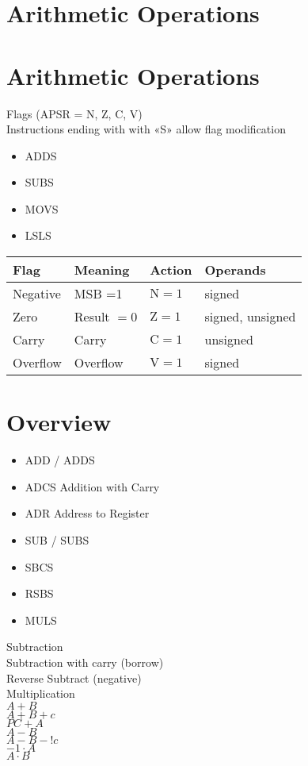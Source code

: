 \section{Arithmetic Operations}

\section*{Arithmetic Operations}
Flags (APSR = N, Z, C, V)\\
Instructions ending with with «S» allow flag modification

\begin{itemize}
  \item ADDS
  \item SUBS
  \item MOVS
  \item LSLS
\end{itemize}

\begin{center}
\begin{tabular}{|llll|}
\hline
Flag & Meaning & Action & Operands \\
\hline
Negative & MSB =1 & $\mathrm{N}=1$ & signed \\
Zero & Result $=0$ & $\mathrm{Z}=1$ & signed, unsigned \\
Carry & Carry & $\mathrm{C}=1$ & unsigned \\
Overflow & Overflow & $\mathrm{V}=1$ & signed \\
\hline
\end{tabular}
\end{center}

\section*{Overview}
\begin{itemize}
  \item ADD / ADDS
  \item ADCS Addition with Carry
  \item ADR Address to Register
  \item SUB / SUBS
  \item SBCS
  \item RSBS
  \item MULS
\end{itemize}

Subtraction\\
Subtraction with carry (borrow)\\
Reverse Subtract (negative)\\
Multiplication\\
$A+B$\\
$A+B+c$\\
$P C+A$\\
$A-B$\\
$A-B-!c$\\
$-1 \cdot A$\\
$A \cdot B$

